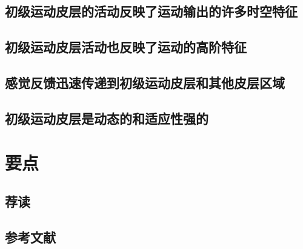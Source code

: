 \subsection{初级运动皮层的活动反映了运动输出的许多时空特征}
\subsection{初级运动皮层活动也反映了运动的高阶特征}
\subsection{感觉反馈迅速传递到初级运动皮层和其他皮层区域}
\subsection{初级运动皮层是动态的和适应性强的}

\section{要点}
\subsection{荐读}
\subsection{参考文献}